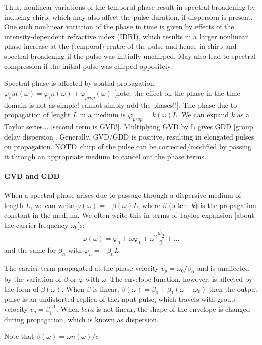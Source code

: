 \documentclass[a4paper]{jpconf}
\begin{document}
\par 
Thus, nonlinear variations of the temporal phase result in spectral broadening by inducing chirp, which may also affect the pulse duration, if dispersion is present. One such nonlinear variation of the phase in time is given by effects of the intensity-dependent refractive index (IDRI), which results in a larger nonlinear phase increase at the (temporal) centre of the pulse and hence in chirp and spectral broadening if the pulse was initially unchirped. May also lead to spectral compression if the initial pulse was chirped oppositely.  \par 

Spectral phase is affected by spatial propagation: $\varphi_out (\omega) = \varphi_in(\omega) + \varphi_{prop}(\omega)$ [note: the effect on the phase in the time domain is not as simple! cannot simply add the phases!!]. The phase due to propagation of lenght $L$ in a medium is $\varphi_{prop} =k(\omega) L$. We can expand $k$ as a Taylor series... [second term is GVD!]. Multiplying GVD by L gives GDD [group delay dispersion]. Generally, GVD/GDD is positive, resulting in elongated pulses on propagation. NOTE: chirp of the pulse can be corrected/modified by passing it through an appropriate medium to cancel out the phase terms. \par 


\paragraph{GVD and GDD}
When a spectral phase arises due to passage through a dispersive medium of length $L$, we can write $\varphi(\omega) = - \beta(\omega) L$, where $\beta$ (often: $k$) is the propagation constant in the medium. We often write this in terms of Taylor expansion [about the carrier frequency $\omega_0$]s:
$$ \varphi(\omega) = \varphi_0 + \omega \varphi_1 + \omega^2 \frac{\phi_2}{2} + ...$$
and the same for $\beta_n$ with $\varphi_n = - \beta_n L$. \par 
The carrier term propagated at the phase velocity $v_p = \omega_0/\beta_0$ and is unaffected by the variation of $\beta$ or $\varphi$ with $\omega$. The envelope function, however, is affected by the form of $\beta(\omega)$. When $\beta$ is linear, $\beta(\omega) = \beta_0 + \beta_1 (\omega - \omega_0)$ then the output pulse is an undistorted replica of thei nput pulse, which travels with group velocity $v_g = \beta_1^{-1}$. When $beta$ is not linear, the shape of the envelope is changed during propagation, which is known as dispersion. \par 
Note that $\beta(\omega) = \omega n(\omega)/c$
\end{document}
